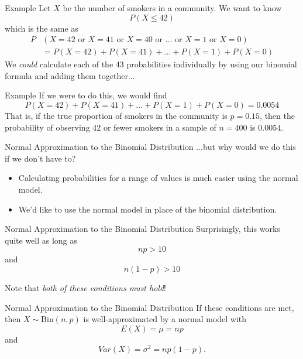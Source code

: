 \begin{frame}{Example}
    Let $X$ be the number of smokers in a community. We want to know
    \[
        P(X \le 42)
    \]
    which is the same as
    \begin{align*}
        P&(X = 42 \text{ or } X=41 \text{ or } X=40 \text{ or } \dots \text{ or } X=1 \text{ or } X=0) \\
        &=P(X=42) + P(X=41) + \dots + P(X=1) + P(X=0)
    \end{align*}
    We \textit{could} calculate each of the 43 probabilities individually by using our binomial formula and adding them together...   
\end{frame}

\begin{frame}{Example}
    If we were to do this, we would find 
    \[
        P(X=42) + P(X=41) + \dots + P(X=1) + P(X=0) = 0.0054
    \]
    That is, if the true proportion of smokers in the community is $p = 0.15$, then the probability of observing $42$ or fewer smokers in a sample of $n = 400$ is $0.0054$.
\end{frame}

\begin{frame}{Normal Approximation to the Binomial Distribution}
    ...but why would we do this if we don't have to?
    
    \begin{itemize}
        \item Calculating probabilities for a range of values is much easier using the normal model.
        \item We'd like to use the normal model in place of the binomial distribution.
    \end{itemize}
\end{frame}

\begin{frame}{Normal Approximation to the Binomial Distribution}
    Surprisingly, this works quite well as long as
    \[
        np > 10
    \]
    and
    \[
        n(1-p) > 10
    \]
    
    \vspace{12pt}Note that \textit{both of these conditions must hold}!
\end{frame}

\begin{frame}{Normal Approximation to the Binomial Distribution}
    If these conditions are met, then $X\sim\text{Bin}(n,p)$ is well-approximated by a normal model with
    \[
        E(X) = \mu = np
    \]
    and
    \[
        Var(X) = \sigma^2 = np(1-p).
    \]
\end{frame}


